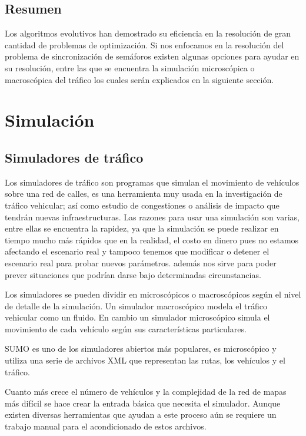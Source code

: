 \subsection{Resumen}
Los algoritmos evolutivos han demostrado su eficiencia en la resolución de gran cantidad de problemas de optimización. Si nos enfocamos en la resolución del problema de sincronización de semáforos existen algunas opciones para ayudar en su resolución, entre las que se encuentra la simulación microscópica o macroscópica del tráfico los cuales serán explicados en la siguiente sección.


\section{Simulación}

\subsection{Simuladores de tráfico}
Los simuladores de tráfico son programas que simulan el movimiento de vehículos sobre una red de calles, es una herramienta muy usada en la investigación de tráfico vehicular; así como estudio de congestiones o análisis de impacto que tendrán nuevas infraestructuras.  Las razones para usar una simulación son varias, entre ellas se encuentra  la rapidez, ya que la simulación se puede realizar en tiempo mucho más rápidos que en la realidad, el costo en dinero pues no estamos afectando el escenario real  y tampoco tenemos que modificar o detener el escenario real para probar nuevos parámetros. además nos sirve para poder prever situaciones que podrían darse bajo determinadas circunstancias.

Los simuladores se pueden dividir en microscópicos o macroscópicos según el nivel de detalle de la simulación. Un simulador macroscópico modela  el tráfico vehicular como un fluido. En cambio un simulador microscópico simula el movimiento de cada vehículo según sus características particulares.

SUMO\citep{SUMO} es uno de los simuladores abiertos más populares, es microscópico y utiliza una serie de archivos  XML que representan las rutas, los vehículos y el tráfico.  

Cuanto más crece el número de vehículos y la complejidad de la red de mapas más difícil se hace crear la entrada básica que necesita el simulador. Aunque existen diversas herramientas que ayudan a este proceso aún se requiere un trabajo manual para el acondicionado de estos archivos.

